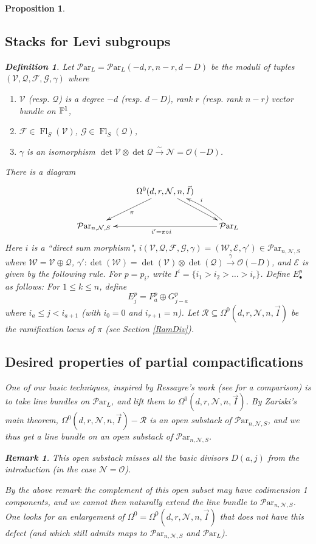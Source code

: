 \documentclass[11pt]{amsart}
\newcommand\bull{{\bullet}}
\newcommand\mf{\mathcal{F}}
\newcommand\me{\mathcal{E}}
\newcommand\Fl{\operatorname{Fl}}
\newcommand\mv{\mathcal{V}}
\newcommand\mg{\mathcal{G}}
\newcommand\mw{\mathcal{W}}
\newcommand\mq{\mathcal{Q}}
\newcommand\mn{\mathcal{N}}
\newcommand\ParL{\mathcal{P}\text{ar}_L}
\newcommand\Par{\mathcal{P}\text{ar} }
\newcommand{\leto}[1]{\stackrel{#1}{\to}}
\newtheorem{remark}[theorem]{ Remark}
\newtheorem{proposition}[theorem]{Proposition}
\newtheorem{defi}[theorem]{Definition}
\numberwithin{theorem}{subsection}
\begin{document}
{\begin{proposition}
\subsection{Stacks for Levi subgroups}
\begin{defi}\label{parul}
Let $\ParL=\ParL(-d,r,n-r,d-D)$ be the moduli of tuples $(\mv,\mq,\mf,\mg,\gamma)$ where
\begin{enumerate}
\item $\mv$ (resp. $\mq$) is a degree $-d$ (resp. $d-D$), rank $r$ (resp. rank $n-r$) vector bundle on $\Bbb{P}^1$,
\item  $\mf\in \Fl_S(\mv)$, $\mg\in \Fl_S(\mq)$,
\item $\gamma$ is an isomorphism $\det \mv\otimes \det\mq\leto{\sim}\mn=\mathcal{O}(-D)$.
\end{enumerate}
\end{defi}
There is a diagram
\begin{equation}\label{Dbasic}
\xymatrix{
 & \Omega^0(d,r,\mn,n,\vec{I})\ar[dl]^{\pi}\ar[dr]\\
\Par_{n,\mn,S}   &  & \ParL\ar@/_/[ul]_i\ar[ll]^{i'=\pi\circ i}
}
\end{equation}
Here $i$ is a ``direct sum morphism", $i(\mv,\mq,\mf,\mg,\gamma)= (\mw,\me,\gamma')\in \Par_{n,\mn,S}$ where $\mw=\mv\oplus\mq$, $\gamma': \det(\mw)=\det(\mv)\otimes\det(\mq)\leto{\gamma} \mathcal{O}(-D)$, and $\me$ is given by the following rule. For $p=p_i$, write $I^i=\{i_1>i_2>\dots>i_r\}$. Define $E^p_{\bull}$ as follows: For  $1\leq k\leq n$, define
$$E^p_{j}=F^p_{a}\oplus G^p_{j-a}$$
where  $i_a\leq j <i_{a+1}$ (with $i_0=0$ and $i_{r+1}=n$). Let $\mathcal{R}\subseteq  \Omega^0(d,r,\mn,n,\vec{I})$ be the ramification locus of $\pi$ (see Section \ref{RamDiv}).

\subsection{Desired properties of partial compactifications}
One of our basic techniques, inspired by Ressayre's work \cite[Section 4.1]{R1} (see \cite[Section 8.6]{BHermit} for a comparison)  is to take line bundles on $\ParL$, and lift them to $\Omega^0(d,r,\mn,n,\vec{I})$.  By Zariski's main theorem, $\Omega^0(d,r,\mn,n,\vec{I})-\mathcal{R}$ is an open substack of $\Par_{n,\mn,S} $, and we thus get a line bundle on an open substack of $\Par_{n,\mn,S} $.

\begin{remark}\label{explainmore}
This open substack misses all the basic divisors $D(a,j)$ from the introduction (in the case $\mn=\mathcal{O}$).
\end{remark}
By the above remark the complement of this open subset may have codimension 1 components, and we cannot then naturally extend the line bundle to  $\Par_{n,\mn,S}$. One looks for an enlargement of   $\Omega^0=\Omega^0(d,r,\mn,n,\vec{I})$ that does not have this defect (and which still admits maps to $\Par_{n,\mn,S} $ and $\ParL$).


\end{proposition}}
\end{document}
